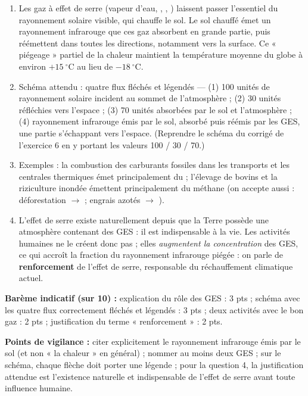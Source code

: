 \documentclass[11pt]{article}
\begin{document}
\begin{corrige}
\begin{enumerate}
\item Les gaz à effet de serre (vapeur d'eau, , , ) laissent passer l'essentiel du rayonnement solaire visible, qui chauffe le sol. Le sol chauffé émet un rayonnement infrarouge que ces gaz absorbent en grande partie, puis réémettent dans toutes les directions, notamment vers la surface. Ce « piégeage » partiel de la chaleur maintient la température moyenne du globe à environ $+15\ ^\circ\mathrm{C}$ au lieu de $-18\ ^\circ\mathrm{C}$.
\item Schéma attendu : quatre flux fléchés et légendés — (1) 100 unités de rayonnement solaire incident au sommet de l'atmosphère ; (2) 30 unités réfléchies vers l'espace ; (3) 70 unités absorbées par le sol et l'atmosphère ; (4) rayonnement infrarouge émis par le sol, absorbé puis réémis par les GES, une partie s'échappant vers l'espace. (Reprendre le schéma du corrigé de l'exercice 6 en y portant les valeurs 100 / 30 / 70.)
\item Exemples : la combustion des carburants fossiles dans les transports et les centrales thermiques émet principalement du  ; l'élevage de bovins et la riziculture inondée émettent principalement du méthane  (on accepte aussi : déforestation $\to$  ; engrais azotés $\to$ ).
\item L'effet de serre existe naturellement depuis que la Terre possède une atmosphère contenant des GES : il est indispensable à la vie. Les activités humaines ne le créent donc pas ; elles \emph{augmentent la concentration} des GES, ce qui accroît la fraction du rayonnement infrarouge piégée : on parle de \textbf{renforcement} de l'effet de serre, responsable du réchauffement climatique actuel.
\end{enumerate}
\textbf{Barème indicatif (sur 10) :} explication du rôle des GES : 3 pts ; schéma avec les quatre flux correctement fléchés et légendés : 3 pts ; deux activités avec le bon gaz : 2 pts ; justification du terme « renforcement » : 2 pts.

\textbf{Points de vigilance :} citer explicitement le rayonnement infrarouge émis par le sol (et non « la chaleur » en général) ; nommer au moins deux GES ; sur le schéma, chaque flèche doit porter une légende ; pour la question 4, la justification attendue est l'existence naturelle et indispensable de l'effet de serre avant toute influence humaine.
\end{corrige}
\end{document}
